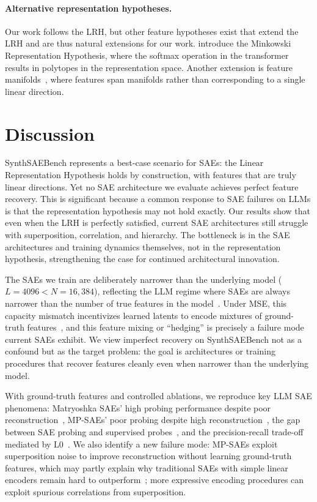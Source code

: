 \documentclass{article}
\theoremstyle{plain}
\theoremstyle{definition}
\theoremstyle{remark}
\begin{document}
\paragraph{Alternative representation hypotheses.} Our work follows the LRH, but other feature hypotheses exist that extend the LRH and are thus natural extensions for our work. \citet{fel2025into} introduce the Minkowski Representation Hypothesis, where the softmax operation in the transformer results in polytopes in the representation space. Another extension is feature manifolds~\citep{chen2018sparse,michaud2025understanding}, where features span manifolds rather than corresponding to a single linear direction. 

\section{Discussion}

SynthSAEBench represents a best-case scenario for SAEs: the Linear Representation Hypothesis holds by construction, with features that are truly linear directions. Yet no SAE architecture we evaluate achieves perfect feature recovery. This is significant because a common response to SAE failures on LLMs is that the representation hypothesis may not hold exactly. Our results show that even when the LRH is perfectly satisfied, current SAE architectures still struggle with superposition, correlation, and hierarchy. The bottleneck is in the SAE architectures and training dynamics themselves, not in the representation hypothesis, strengthening the case for continued architectural innovation.

The SAEs we train are deliberately narrower than the underlying model ($L = 4096 < N = 16{,}384$), reflecting the LLM regime where SAEs are always narrower than the number of true features in the model~\citep{templeton2024scaling}. Under MSE, this capacity mismatch incentivizes learned latents to encode mixtures of ground-truth features~\citep{chanin2025feature,chanin2025sparse}, and this feature mixing or ``hedging'' is precisely a failure mode current SAEs exhibit. We view imperfect recovery on SynthSAEBench not as a confound but as the target problem: the goal is architectures or training procedures that recover features cleanly even when narrower than the underlying model.

With ground-truth features and controlled ablations, we reproduce key LLM SAE phenomena: Matryoshka SAEs' high probing performance despite poor reconstruction~\citep{bussmann2025learning}, MP-SAEs' poor probing despite high reconstruction~\citep{chanin2025trainingmpsaes}, the gap between SAE probing and supervised probes~\citep{kantamneni2025sparse}, and the precision-recall trade-off mediated by L0~\citep{chanin2025a}. We also identify a new failure mode: MP-SAEs exploit superposition noise to improve reconstruction without learning ground-truth features, which may partly explain why traditional SAEs with simple linear encoders remain hard to outperform~\citep{oneill2025compute}; more expressive encoding procedures can exploit spurious correlations from superposition.
\end{document}
